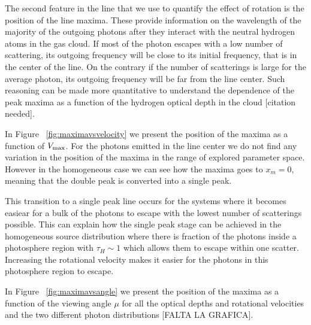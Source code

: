 \documentclass[usenatbib]{mn2e}
\begin{document}

The second feature in the line that we use to quantify the effect of
rotation is the position of the line maxima. These provide information
on the wavelength of the majority of the outgoing photons after
they interact with the neutral hydrogen atoms in the gas cloud. If
most of the photon escapes with a low number of scattering, its
outgoing frequency will be close to its initial frequency, that is in
the center of the line. On the contrary if the number of scatterings
is large for the average photon, its outgoing frequency will be far
from the line center. Such reasoning can be made more quantitative to
understand the dependence of the peak maxima as a function of the
hydrogen optical depth in the cloud [citation needed].


In Figure ~\ref{fig:maximavsvelocity} we present the position
of the maxima as a function of $V_{\rm max}$. For the photons emitted
in the line center we do not find any variation in the position of the
maxima in the range of explored parameter space. However in the
homogeneous case we can see how the maxima goes to $x_{m}=0$, meaning
that the double peak is converted into a single peak.

This transition to a single peak line occurs for the systems where it
becomes easiear for a bulk of the photons to escape with the lowest
number of scatterings possible. This can explain how the single peak
stage can be achieved in the homogeneous source distribution where
there is fraction of the photons inside a photosphere region with
$\tau_{H}\sim 1$ which allows them to escape within one
scatter. Increasing the rotational velocity makes it easier for the
photons in this photosphere region to escape.

In Figure ~\ref{fig:maximavsangle} we present the position of the
maxima as a function of the viewing angle $\mu$ for all the optical
depths and rotational velocities and the two different photon
distributions [FALTA LA GRAFICA]. 


\end{document}
